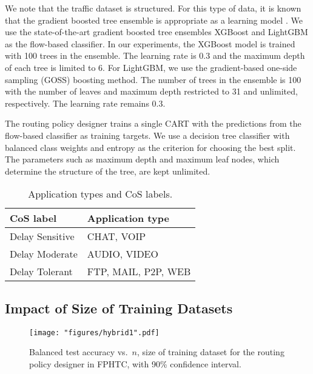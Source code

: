We note that the traffic dataset is structured. For this type of data, it is known that the gradient boosted tree ensemble is appropriate as a learning model \cite{Kdd15}. We use the state-of-the-art gradient boosted tree ensembles XGBoost \cite{Xgb16} and LightGBM \cite{Lgbm17} as the flow-based classifier. In our experiments, the XGBoost model is trained with 100 trees in the ensemble. The learning rate is 0.3 and the maximum depth of each tree is limited to 6. For LightGBM, we use the gradient-based one-side sampling (GOSS) boosting method. The number of trees in the ensemble is 100 with the number of leaves and maximum depth restricted to 31 and unlimited, respectively. The learning rate remains 0.3.  

The routing policy designer trains a single CART with the predictions from the flow-based classifier as training targets. We use a decision tree classifier with balanced class weights and entropy as the criterion for choosing the best split. The parameters such as maximum depth and maximum leaf nodes, which determine the structure of the tree, are kept unlimited.

\begin{table}[t]
	\centering
	\begin{tabular}{|P{0.4\textwidth}|P{0.4\textwidth}|}
		\hline
		CoS label       & Application type    \\ \hline
		Delay Sensitive & CHAT, VOIP          \\ \hline
		Delay Moderate  & AUDIO, VIDEO        \\ \hline
		Delay Tolerant  & FTP, MAIL, P2P, WEB \\ \hline
	\end{tabular}
	\caption{Application types and CoS labels.}
	\label{tab:cos}
\end{table}


\subsection{Impact of Size of Training Datasets}

\begin{figure}[t]
	\centering
	\texttt{[image: "figures/hybrid1".pdf]}
	\caption{Balanced test accuracy vs.~$n$, size of training dataset for the routing policy designer in FPHTC, with 90\% confidence interval.}
	\label{fig:hybrid1}
\end{figure}

